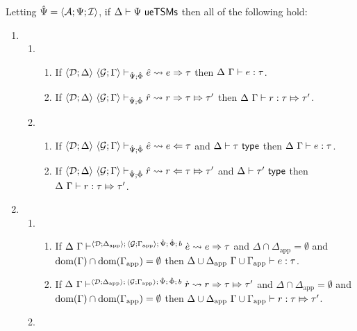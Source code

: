\begin{theorem} Letting $\hat{\Psi}=\langle \mathcal{A}; \Psi; \mathcal{I} \rangle$, if $\Delta \vdash \Psi~\mathsf{ueTSMs}$ then all of the following hold:
\begin{enumerate}
  \item \begin{enumerate}
    \item \begin{enumerate}
      \item If $\langle \mathcal{D}; \Delta \rangle~\langle \mathcal{G}; \Gamma \rangle \vdash_{\hat{\Psi}; \hat\Phi} {\hat e} \leadsto e \Rightarrow \tau$ then $\Delta~\Gamma \vdash e : \tau$.
      \item If $\langle \mathcal{D}; \Delta \rangle~\langle \mathcal{G}; \Gamma \rangle \vdash_{\hat{\Psi}; \hat\Phi} \hat{r} \leadsto r \Rightarrow \tau \Mapsto \tau'$  then $\Delta~\Gamma \vdash r : \tau \Mapsto \tau'$.
    \end{enumerate}
    \item \begin{enumerate}
      \item If $\langle \mathcal{D}; \Delta \rangle~\langle \mathcal{G}; \Gamma \rangle \vdash_{\hat{\Psi}; \hat\Phi} {\hat e} \leadsto e \Leftarrow \tau$ and $\Delta \vdash \tau~\mathsf{type}$ then $\Delta~\Gamma \vdash e : \tau$.
      \item If $\langle \mathcal{D}; \Delta \rangle~\langle \mathcal{G}; \Gamma \rangle \vdash_{\hat{\Psi}; \hat\Phi} \hat{r} \leadsto r \Leftarrow \tau \Mapsto \tau'$ and $\Delta \vdash \tau'~\mathsf{type}$ then $\Delta~\Gamma \vdash r : \tau \Mapsto \tau'$.
    \end{enumerate}
  \end{enumerate}
  \item \begin{enumerate}
    \item \begin{enumerate}
      \item If $\Delta~\Gamma \vdash^{\langle \mathcal{D}; \Delta_\text{app} \rangle;\,\langle \mathcal{G}; \Gamma_\text{app} \rangle;\,\hat{\Psi};\,\hat\Phi;\,b} \grave{e} \leadsto e \Rightarrow \tau$ and $\Delta \cap \Delta_\text{app}=\emptyset$ and $\text{dom}(\Gamma) \cap \text{dom}(\Gamma_\text{app})=\emptyset$ then ${\Delta}\cup{\Delta_\text{app}}~{\Gamma}\cup{\Gamma_\text{app}} \vdash e : \tau$. 
      \item If $\Delta~\Gamma \vdash^{\langle \mathcal{D}; \Delta_\text{app} \rangle;\,\langle \mathcal{G}; \Gamma_\text{app} \rangle;\,\hat{\Psi};\,\hat\Phi;\,b} \grave{r} \leadsto r \Rightarrow \tau \Mapsto \tau'$ and $\Delta \cap \Delta_\text{app}=\emptyset$ and $\text{dom}(\Gamma) \cap \text{dom}(\Gamma_\text{app})=\emptyset$ then ${\Delta}\cup{\Delta_\text{app}}~{\Gamma}\cup{\Gamma_\text{app}} \vdash r : \tau \Mapsto \tau'$.
    \end{enumerate}
    \item \begin{enumerate}

\end{enumerate}
\end{enumerate}
\end{enumerate}
\end{theorem}

